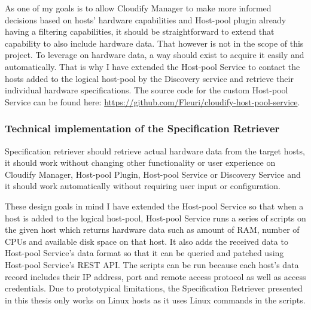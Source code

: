 As one of my goals is to allow Cloudify Manager to make more informed decisions based on hosts' hardware capabilities and Host-pool plugin already having a filtering capabilities, it should be straightforward to extend that capability to also include hardware data. That however is not in the scope of this project. To leverage on hardware data, a way should exist to acquire it easily and automatically. That is why I have extended the Host-pool Service to contact the hosts added to the logical host-pool by the Discovery service and retrieve their individual hardware specifications. The source code for the custom Host-pool Service can be found here: \url{https://github.com/Fleuri/cloudify-host-pool-service}.

\subsubsection{Technical implementation of the Specification Retriever}

Specification retriever should retrieve actual hardware data from the target hosts, it should work without changing other functionality or user experience on Cloudify Manager, Host-pool Plugin, Host-pool Service or Discovery Service and it should work automatically without requiring user input or configuration.

These design goals in mind I have extended the Host-pool Service so that when a host is added to the logical host-pool, Host-pool Service runs a series of scripts on the given host which returns hardware data such as amount of RAM, number of CPUs and available disk space on that host.
It also adds the received data to Host-pool Service's data format so that it can be queried and patched using Host-pool Service's REST API. The scripts can be run because each host's data record includes their IP address, port and remote access protocol as well as access credentials. Due to prototypical limitations, the Specification Retriever presented in this thesis only works on Linux hosts as it uses Linux commands in the scripts.

\pagebreak



